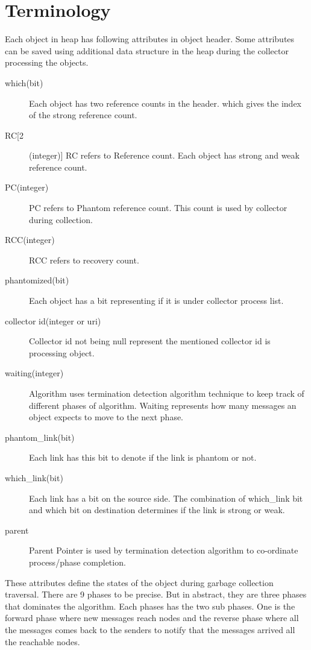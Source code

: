 \documentclass{article}
\begin{document}
\section{Terminology}
Each object in heap has following attributes in object header. Some attributes can be saved using additional data structure in the heap during the collector processing the objects. 
\begin{description}
  \item[which(bit)] Each object has two reference counts in the header. which gives the index of the strong reference count.
  \item[RC[2](integer)] RC refers to Reference count. Each object has strong and weak reference count.
  \item[PC(integer)] PC refers to Phantom reference count. This count is used by collector during collection.
  \item[RCC(integer)] RCC refers to recovery count.
  \item[phantomized(bit)] Each object has a bit representing if it is under collector process list.
  \item[collector id(integer or uri)] Collector id not being null represent the mentioned collector id is processing object.
  \item[waiting(integer)] Algorithm uses termination detection algorithm technique to keep track of different phases of algorithm. Waiting represents how many messages an object expects to move to the next phase.
  \item[phantom\_link(bit)] Each link has this bit to denote if the link is phantom or not.
  \item[which\_link(bit)] Each link has a bit on the source side. The combination of which\_link bit and which bit on destination determines if the link is strong or weak.
\item[parent] Parent Pointer is used by termination detection algorithm to co-ordinate process/phase completion.
\end{description}
These attributes define the states of the object during garbage collection traversal. There are 9 phases to be precise. But in abstract, they are three phases that dominates the algorithm. Each phases has the two sub phases. One is the forward phase where new messages reach nodes and the reverse phase where all the messages comes back to the senders to notify that the messages arrived all the reachable nodes. 
\end{document}
